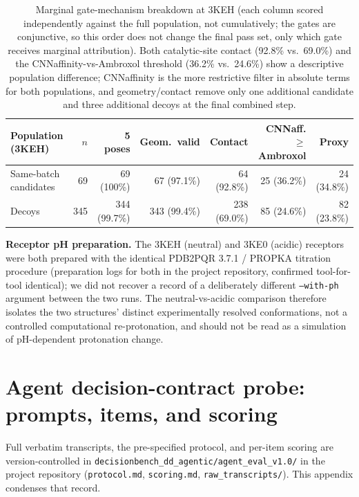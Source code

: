 \documentclass{article}
\begin{document}
\begin{table}[h]
\addtocounter{table}{-3}
\centering
\footnotesize
\setlength{\tabcolsep}{4pt}
\begin{tabular}{lrrrrrr}
\toprule
Population (3KEH) & $n$ & 5 poses & Geom.\ valid & Contact & CNNaff.$\geq$Ambroxol & Proxy \\
\midrule
Same-batch candidates & 69 & 69 (100\%) & 67 (97.1\%) & 64 (92.8\%) & 25 (36.2\%) & 24 (34.8\%) \\
Decoys & 345 & 344 (99.7\%) & 343 (99.4\%) & 238 (69.0\%) & 85 (24.6\%) & 82 (23.8\%) \\
\bottomrule
\end{tabular}
\caption{Marginal gate-mechanism breakdown at 3KEH (each column scored independently against the full population, not cumulatively; the gates are conjunctive, so this order does not change the final pass set, only which gate receives marginal attribution). Both catalytic-site contact (92.8\% vs.\ 69.0\%) and the CNNaffinity-vs-Ambroxol threshold (36.2\% vs.\ 24.6\%) show a descriptive population difference; CNNaffinity is the more restrictive filter in absolute terms for both populations, and geometry/contact remove only one additional candidate and three additional decoys at the final combined step.}
\label{tab:decoy-gate-mechanism}
\end{table}

\textbf{Receptor pH preparation.} The 3KEH (neutral) and 3KE0 (acidic) receptors were both prepared with the identical PDB2PQR 3.7.1 / PROPKA titration procedure (preparation logs for both in the project repository, confirmed tool-for-tool identical); we did not recover a record of a deliberately different \texttt{--with-ph} argument between the two runs. The neutral-vs-acidic comparison therefore isolates the two structures' distinct experimentally resolved conformations, not a controlled computational re-protonation, and should not be read as a simulation of pH-dependent protonation change.

\FloatBarrier
\section{Agent decision-contract probe: prompts, items, and scoring}
\label{app:i}

Full verbatim transcripts, the pre-specified protocol, and per-item scoring are version-controlled in \texttt{decisionbench\_dd\_agentic/agent\_eval\_v1.0/} in the project repository (\texttt{protocol.md}, \texttt{scoring.md}, \texttt{raw\_transcripts/}). This appendix condenses that record.
\end{document}
